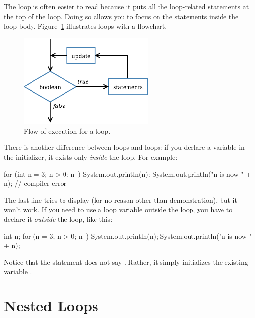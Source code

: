 The  loop is often easier to read because it puts all the loop-related statements at the top of the loop.
Doing so allows you to focus on the statements inside the loop body.
Figure~\ref{fig.for} illustrates  loops with a flowchart.


\begin{figure}[!ht]
\begin{center}
\includegraphics[width=190pt]{figs/for.pdf}
\caption{Flow of execution for a  loop.}
\label{fig.for}
\end{center}
\end{figure}

There is another difference between  loops and  loops: if you declare a variable in the initializer, it exists only {\em inside} the  loop.
For example:

\begin{code}
for (int n = 3; n > 0; n--) {
    System.out.println(n);
}
System.out.println("n is now " + n);  // compiler error
\end{code}

The last line tries to display  (for no reason other than demonstration), but it won't work.
If you need to use a loop variable outside the loop, you have to declare it {\em outside} the loop, like this:

\begin{code}
int n;
for (n = 3; n > 0; n--) {
    System.out.println(n);
}
System.out.println("n is now " + n);
\end{code}

Notice that the  statement does not say .
Rather, it simply initializes the existing variable .


\section{Nested Loops}
\label{nested}

